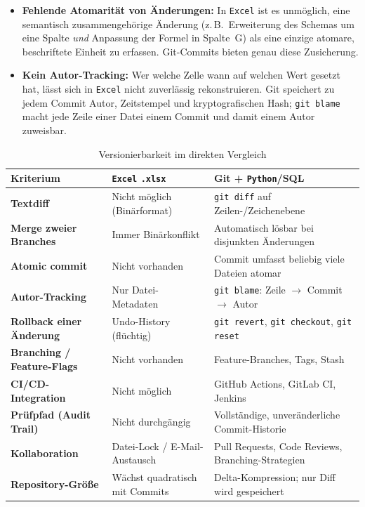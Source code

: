 ﻿\documentclass[12pt,a4paper]{report}
\theoremstyle{definition}
\theoremstyle{remark}
\newcommand{\excel}{\texttt{Excel}}
\newcommand{\py}{\texttt{Python}}
\newcommand{\code}[1]{\texttt{#1}}
\begin{document}
\begin{itemize}[leftmargin=1.5em, itemsep=3pt]
  \item \textbf{Fehlende Atomarität von Änderungen:}
        In \excel{} ist es unmöglich, eine semantisch zusammengehörige
        Änderung (z.\,B.\ Erweiterung des Schemas um eine Spalte
        \emph{und} Anpassung der Formel in Spalte~G) als eine einzige
        atomare, beschriftete Einheit zu erfassen.
        Git-Commits bieten genau diese Zusicherung.

  \item \textbf{Kein Autor-Tracking:}
        Wer welche Zelle wann auf welchen Wert gesetzt hat, lässt sich
        in \excel{} nicht zuverlässig rekonstruieren. Git speichert
        zu jedem Commit Autor, Zeitstempel und kryptografischen Hash;
        \code{git blame} macht jede Zeile einer Datei einem
        Commit und damit einem Autor zuweisbar.
\end{itemize}

\begin{table}[H]
\centering
\caption{Versionierbarkeit im direkten Vergleich}
\label{tab:git-vergleich}
\renewcommand{\arraystretch}{1.35}
\begin{tabularx}{\linewidth}{>{\bfseries\footnotesize}l
                              >{\footnotesize}X
                              >{\footnotesize}X}
\toprule
Kriterium                 & \excel{} \code{.xlsx}            & Git + \py{}/SQL \\
\midrule
Textdiff                  & Nicht möglich (Binärformat)      & \code{git diff} auf Zeilen-/Zeichenebene \\
Merge zweier Branches     & Immer Binärkonflikt              & Automatisch lösbar bei disjunkten Änderungen \\
Atomic commit             & Nicht vorhanden                  & Commit umfasst beliebig viele Dateien atomar \\
Autor-Tracking            & Nur Datei-Metadaten              & \code{git blame}: Zeile $\to$ Commit $\to$ Autor \\
Rollback einer Änderung   & Undo-History (flüchtig)          & \code{git revert}, \code{git checkout}, \code{git reset} \\
Branching / Feature-Flags & Nicht vorhanden                  & Feature-Branches, Tags, Stash \\
CI/CD-Integration         & Nicht möglich                    & GitHub Actions, GitLab CI, Jenkins \\
Prüfpfad (Audit Trail)    & Nicht durchgängig                & Vollständige, unveränderliche Commit-Historie \\
Kollaboration             & Datei-Lock / E-Mail-Austausch    & Pull Requests, Code Reviews, Branching-Strategien \\
Repository-Größe          & Wächst quadratisch mit Commits   & Delta-Kompression; nur Diff wird gespeichert \\
\bottomrule
\end{tabularx}
\end{table}
\end{document}
